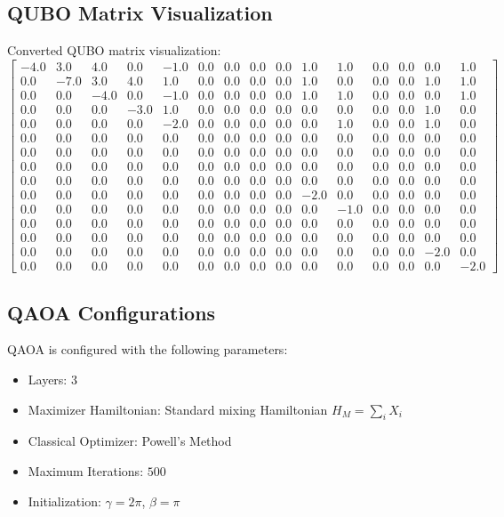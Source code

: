 \documentclass{article}%
\begin{document}
\subsection{QUBO Matrix Visualization}%
\label{subsec:QUBOMatrixVisualization}%
Converted QUBO matrix visualization:\newline%
%
$\begin{bmatrix}
-4.0 & 3.0 & 4.0 & 0.0 & -1.0 & 0.0 & 0.0 & 0.0 & 0.0 & 1.0 & 1.0 & 0.0 & 0.0 & 0.0 & 1.0\\0.0 & -7.0 & 3.0 & 4.0 & 1.0 & 0.0 & 0.0 & 0.0 & 0.0 & 1.0 & 0.0 & 0.0 & 0.0 & 1.0 & 1.0\\0.0 & 0.0 & -4.0 & 0.0 & -1.0 & 0.0 & 0.0 & 0.0 & 0.0 & 1.0 & 1.0 & 0.0 & 0.0 & 0.0 & 1.0\\0.0 & 0.0 & 0.0 & -3.0 & 1.0 & 0.0 & 0.0 & 0.0 & 0.0 & 0.0 & 0.0 & 0.0 & 0.0 & 1.0 & 0.0\\0.0 & 0.0 & 0.0 & 0.0 & -2.0 & 0.0 & 0.0 & 0.0 & 0.0 & 0.0 & 1.0 & 0.0 & 0.0 & 1.0 & 0.0\\0.0 & 0.0 & 0.0 & 0.0 & 0.0 & 0.0 & 0.0 & 0.0 & 0.0 & 0.0 & 0.0 & 0.0 & 0.0 & 0.0 & 0.0\\0.0 & 0.0 & 0.0 & 0.0 & 0.0 & 0.0 & 0.0 & 0.0 & 0.0 & 0.0 & 0.0 & 0.0 & 0.0 & 0.0 & 0.0\\0.0 & 0.0 & 0.0 & 0.0 & 0.0 & 0.0 & 0.0 & 0.0 & 0.0 & 0.0 & 0.0 & 0.0 & 0.0 & 0.0 & 0.0\\0.0 & 0.0 & 0.0 & 0.0 & 0.0 & 0.0 & 0.0 & 0.0 & 0.0 & 0.0 & 0.0 & 0.0 & 0.0 & 0.0 & 0.0\\0.0 & 0.0 & 0.0 & 0.0 & 0.0 & 0.0 & 0.0 & 0.0 & 0.0 & -2.0 & 0.0 & 0.0 & 0.0 & 0.0 & 0.0\\0.0 & 0.0 & 0.0 & 0.0 & 0.0 & 0.0 & 0.0 & 0.0 & 0.0 & 0.0 & -1.0 & 0.0 & 0.0 & 0.0 & 0.0\\0.0 & 0.0 & 0.0 & 0.0 & 0.0 & 0.0 & 0.0 & 0.0 & 0.0 & 0.0 & 0.0 & 0.0 & 0.0 & 0.0 & 0.0\\0.0 & 0.0 & 0.0 & 0.0 & 0.0 & 0.0 & 0.0 & 0.0 & 0.0 & 0.0 & 0.0 & 0.0 & 0.0 & 0.0 & 0.0\\0.0 & 0.0 & 0.0 & 0.0 & 0.0 & 0.0 & 0.0 & 0.0 & 0.0 & 0.0 & 0.0 & 0.0 & 0.0 & -2.0 & 0.0\\0.0 & 0.0 & 0.0 & 0.0 & 0.0 & 0.0 & 0.0 & 0.0 & 0.0 & 0.0 & 0.0 & 0.0 & 0.0 & 0.0 & -2.0
\end{bmatrix}$

%
\subsection{QAOA Configurations}%
\label{subsec:QAOAConfigurations}%
QAOA is configured with the following parameters:\newline%
%
\begin{itemize}%
\item%
Layers: \(3\)%
\item%
Maximizer Hamiltonian: Standard mixing Hamiltonian \( H_M = \sum_{i} X_i \)%
\item%
Classical Optimizer: Powell's Method%
\item%
Maximum Iterations: \(500\)%
\item%
Initialization: \(\gamma = 2\pi\), \(\beta = \pi\)%
\end{itemize}
\end{document}

